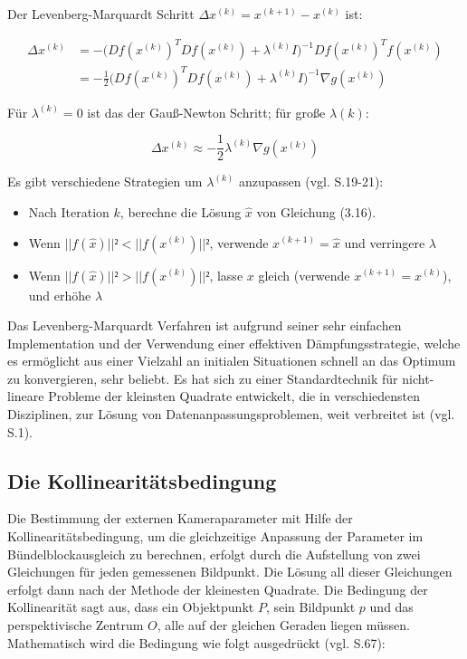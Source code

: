 Der Levenberg-Marquardt Schritt $\Delta x^{(k)} = x^{(k+1)} - x^{(k)}$ ist:

\begin{equation}
\begin{aligned}
\Delta x^{(k)} &= -\Big(Df(x^{(k)})^TDf(x^{(k)})+\lambda^{(k)}I\Big)^{-1} Df(x^{(k)})^T f(x^{(k)})\\ &= -\frac{1}{2} \Big(Df(x^{(k)})^TDf(x^{(k)})+\lambda^{(k)}I\Big)^{-1} \nabla g(x^{(k)})
\end{aligned}
\end{equation}

Für $\lambda^{(k)}=0$ ist das der Gauß-Newton Schritt; für große $\lambda{(k)}$:

\begin{equation}
\Delta x^{(k)} \approx -\frac{1}{2}\lambda^{(k)}\nabla g(x^{(k)})
\end{equation}

Es gibt verschiedene Strategien um $\lambda^{(k)}$ anzupassen (vgl. \cite{nonlinear_1} S.19-21):

\begin{itemize}
\item Nach Iteration $k$, berechne die Lösung $\hat{x}$ von Gleichung (3.16).
\item Wenn $||f(\hat{x})||²<||f(x^{(k)})||²$, verwende $x^{(k+1)} = \hat{x}$ und verringere $\lambda$
\item Wenn $||f(\hat{x})||²>||f(x^{(k)})||²$, lasse $x$ gleich (verwende $x^{(k+1)} = x^{(k)}$), und erhöhe $\lambda$
\end{itemize}

Das Levenberg-Marquardt Verfahren ist aufgrund seiner sehr einfachen Implementation und der Verwendung einer effektiven Dämpfungsstrategie, welche es ermöglicht aus einer Vielzahl an initialen Situationen schnell an das Optimum zu konvergieren, sehr beliebt. Es hat sich zu einer Standardtechnik für nicht-lineare Probleme der kleinsten Quadrate entwickelt, die in verschiedensten Disziplinen, zur Lösung von Datenanpassungsproblemen, weit verbreitet ist (vgl. \cite{lev_efficient} S.1).

\subsection{Die Kollinearitätsbedingung}

Die Bestimmung der externen Kameraparameter mit Hilfe der Kollinearitätsbedingung, um die gleichzeitige Anpassung der Parameter im Bündelblockausgleich zu berechnen, erfolgt durch die Aufstellung von zwei Gleichungen für jeden gemessenen Bildpunkt. Die Lösung all dieser Gleichungen erfolgt dann nach der Methode der kleinesten Quadrate. Die Bedingung der Kollinearität sagt aus, dass ein Objektpunkt $P$, sein Bildpunkt $p$ und das perspektivische Zentrum $O$, alle auf der gleichen Geraden liegen müssen. Mathematisch wird die Bedingung wie folgt ausgedrückt (vgl. \cite{comparative_conditions_study} S.67):

